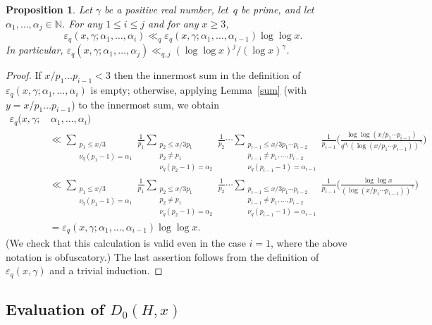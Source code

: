 \documentclass[12pt,reqno]{amsart}
\newtheorem{proposition}[theorem]{Proposition}
\theoremstyle{definition}
\newcommand{\N}{{\mathbb N}}
\newcommand{\ep}{\varepsilon}
\begin{document}
\begin{proposition} \label{recarg2}
Let $\gamma$ be a positive real number, let~$q$ be prime, and let $\alpha_1,\ldots,\alpha_j\in\N$. For any $1\le i\le j$ and for any $x\ge3$,
\[
\ep_q(x,\gamma;\alpha_1,\ldots,\alpha_i)\ll_q \ep_q(x,\gamma;\alpha_1,\ldots,\alpha_{i-1}) \log\log x.
\]
In particular, $\ep_q(x,\gamma;\alpha_1,\ldots,\alpha_j) \ll_{q,j} (\log\log x)^j/(\log x)^\gamma$.
\end{proposition}

\begin{proof}
If $x/p_1\dots p_{i-1} < 3$ then the innermost sum in the definition of $\ep_q(x,\gamma;\alpha_1,\ldots,\alpha_i)$ is empty; otherwise, applying Lemma~\ref{sum} (with $y=x/p_1\dots p_{i-1}$) to the innermost sum, we obtain
\begin{align*}
\ep_q(x,\gamma; &\, \alpha_1,\ldots,\alpha_i)\\
&\ll \sum_{\substack{p_1\le x/3\\\nu_q(p_1-1)=\alpha_1}}\frac 1{p_1}\sum_{\substack{p_2\le x/3p_1\\p_2\ne p_1\\\nu_q(p_2-1)=\alpha_2}}\frac 1{p_2}\cdots \sum_{\substack{p_{i-1}\le x/3p_1\cdots p_{i-2}\\p_{i-1}\ne p_1,\ldots,p_{i-2}\\\nu_q(p_{i-1}-1)=\alpha_{i-1}}}\frac 1{p_{i-1}}\bigg( \frac{\log\log(x/p_1\cdots p_{i-1})}{q^{\alpha_i}(\log(x/p_1\cdots p_{i-1}))^\gamma}\bigg) \\
&\ll \sum_{\substack{p_1\le x/3\\\nu_q(p_1-1)=\alpha_1}}\frac 1{p_1}\sum_{\substack{p_2\le x/3p_1\\p_2\ne p_1\\\nu_q(p_2-1)=\alpha_2}}\frac 1{p_2}\cdots \sum_{\substack{p_{i-1}\le x/3p_1\cdots p_{i-2}\\p_{i-1}\ne p_1,\ldots,p_{i-2}\\\nu_q(p_{i-1}-1)=\alpha_{i-1}}}\frac 1{p_{i-1}}\bigg( \frac{\log\log x}{(\log(x/p_1\cdots p_{i-1}))^\gamma}\bigg) \\
&= \ep_q(x,\gamma;\alpha_1,\ldots,\alpha_{i-1}) \log\log x.
\end{align*}
(We check that this calculation is valid even in the case $i=1$, where the above notation is obfuscatory.)
The last assertion follows from the definition of $\ep_q(x,\gamma)$ and a trivial induction.
\end{proof}


\subsection{Evaluation of $D_0(H,x)$}
\end{document}
